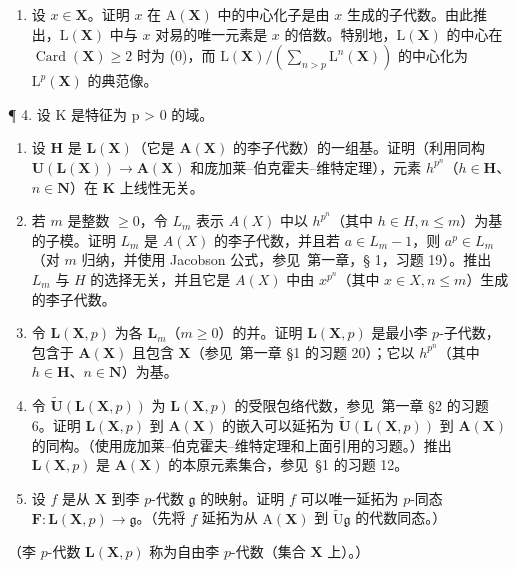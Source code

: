 \begin{enumerate}
\def\labelenumi{\arabic{enumi}.}
\setcounter{enumi}{2}
\tightlist
\item
  设 \(x \in \mathbf{X}\)。证明 \(x\) 在 \(\mathrm{A}(\mathbf{X})\) 中的中心化子是由 \(x\) 生成的子代数。由此推出，\(\mathrm{L}(\mathbf{X})\) 中与 \(x\) 对易的唯一元素是 \(x\) 的倍数。特别地，\(\mathrm{L}(\mathbf{X})\) 的中心在 \(\operatorname{Card}(\mathbf{X}) \geqslant 2\) 时为 (0)，而 \(\mathrm{L}(\mathbf{X}) / \left( \sum_{n > p} \mathrm{L}^n(\mathbf{X}) \right)\) 的中心化为 \(\mathrm{L}^p(\mathbf{X})\) 的典范像。
\end{enumerate}


¶ 4. 设 K 是特征为 p \textgreater{} 0 的域。

\begin{enumerate}
\def\labelenumi{(\alph{enumi})}
\item
  设 \(\mathbf{H}\) 是 \(\mathbf{L}(\mathbf{X})\)（它是 \(\mathbf{A}(\mathbf{X})\) 的李子代数）的一组基。证明（利用同构 \(\mathbf{U}(\mathbf{L}(\mathbf{X})) \to \mathbf{A}(\mathbf{X})\) 和庞加莱–伯克霍夫–维特定理），元素 \(h^{p^n}\)（\(h \in \mathbf{H}\)、\(n \in \mathbf{N}\)）在 \(\mathbf{K}\) 上线性无关。
\item
  若 \(m\) 是整数 \(\geqslant 0\)，令 \(L_m\) 表示 \(A(X)\) 中以 \(h^{p^n}\)（其中 \(h \in H, n \leqslant m\)）为基的子模。证明 \(L_m\) 是 \(A(X)\) 的李子代数，并且若 \(a \in L_m - 1\)，则 \(a^p \in L_m\)（对 \(m\) 归纳，并使用 Jacobson 公式，参见~第一章，§ 1，习题 19）。推出 \(L_m\) 与 \(H\) 的选择无关，并且它是 \(A(X)\) 中由 \(x^{p^n}\)（其中 \(x \in X, n \leqslant m\)）生成的李子代数。
\item
  令 \(\mathbf{L}(\mathbf{X}, p)\) 为各 \(\mathbf{L}_m\)（\(m \geqslant 0\)）的并。证明 \(\mathbf{L}(\mathbf{X}, p)\) 是最小李 \(p\)-子代数，包含于 \(\mathbf{A}(\mathbf{X})\) 且包含 \(\mathbf{X}\)（参见~第一章 §1 的习题 20）；它以 \(h^{p^n}\)（其中 \(h \in \mathbf{H}\)、\(n \in \mathbf{N}\)）为基。
\item
  令 \(\tilde{\mathbf{U}}(\mathbf{L}(\mathbf{X},p))\) 为 \(\mathbf{L}(\mathbf{X},p)\) 的受限包络代数，参见~第一章 §2 的习题 6。证明 \(\mathbf{L}(\mathbf{X},p)\) 到 \(\mathbf{A}(\mathbf{X})\) 的嵌入可以延拓为 \(\tilde{\mathbf{U}}(\mathbf{L}(\mathbf{X},p))\) 到 \(\mathbf{A}(\mathbf{X})\) 的同构。（使用庞加莱–伯克霍夫–维特定理和上面引用的习题。）推出 \(\mathbf{L}(\mathbf{X},p)\) 是 \(\mathbf{A}(\mathbf{X})\) 的本原元素集合，参见~§1 的习题 12。
\item
  设 \(f\) 是从 \(\mathbf{X}\) 到李 \(p\)-代数 \(\mathfrak{g}\) 的映射。证明 \(f\) 可以唯一延拓为 \(p\)-同态 \(\mathbf{F} \colon \mathbf{L}(\mathbf{X}, p) \to \mathfrak{g}\)。（先将 \(f\) 延拓为从 \(\mathrm{A}(\mathbf{X})\) 到 \(\tilde{\mathrm{U}}\mathfrak{g}\) 的代数同态。）
\end{enumerate}

（李 \(p\)-代数 \(\mathbf{L}(\mathbf{X}, p)\) 称为自由李 \(p\)-代数（集合 \(\mathbf{X}\) 上）。）

